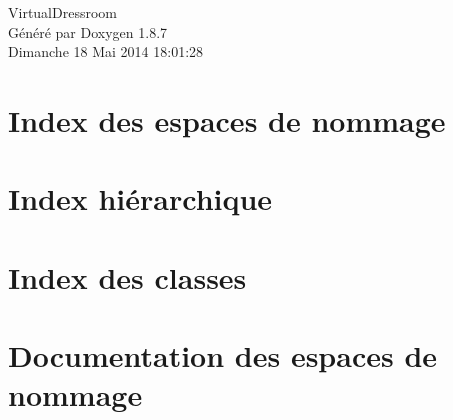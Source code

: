 \documentclass[twoside]{book}
\newcommand{\+}{\discretionary{\mbox{\scriptsize$\hookleftarrow$}}{}{}}
\newcommand{\clearemptydoublepage}{%
  \newpage{\pagestyle{empty}\cleardoublepage}%
}
\begin{document}
\hypersetup{pageanchor=false,
             bookmarks=true,
             bookmarksnumbered=true,
             pdfencoding=unicode
            }
\begin{titlepage}
\vspace*{7cm}
\begin{center}%
{\Large Virtual\+Dressroom }\\
\vspace*{1cm}
{\large Généré par Doxygen 1.8.7}\\
\vspace*{0.5cm}
{\small Dimanche 18 Mai 2014 18:01:28}\\
\end{center}
\end{titlepage}
\clearemptydoublepage
\tableofcontents
\clearemptydoublepage
{}
\hypersetup{pageanchor=true}

\chapter{Index des espaces de nommage}

\chapter{Index hiérarchique}

\chapter{Index des classes}

\chapter{Documentation des espaces de nommage}






\end{document}
